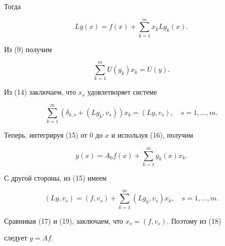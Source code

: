 \begin{pf}
Тогда


\begin{equation}


Ly(x)=f(x)+\sum\limits_{k=1}^m x_kLg_k(x).


\end{equation}


Из (9) получим


\begin{equation}


\sum\limits_{k=1}^m U(g_k)x_k=U(y).


\end{equation}


Из (14) заключаем, что $x_s$ удовлетворяет системе


\begin{equation}


\sum\limits_{k=1}^m(\delta_{k,s}+(Lg_k,v_s))x_k=(Ly,v_s),\quad


s=1,\dotsc,m.


\end{equation}


Теперь, интегрируя (15) от $0$ до $x$ и используя (16), получим


\begin{equation}


y(x)=A_0f(x)+\sum\limits_{k=1}^mg_k(x)x_k.


\end{equation}


С другой стороны, из (15) имеем


\begin{equation}


(Ly,v_s)=(f,v_s)+\sum\limits_{k=1}^m(Lg_k,v_s)x_k,\quad s=1,\dotsc,m.


\end{equation}


Сравнивая (17) и (19), заключаем, что $x_s=(f,v_s)$. Поэтому из (18)


следует $y=Af$.


\end{pf}





